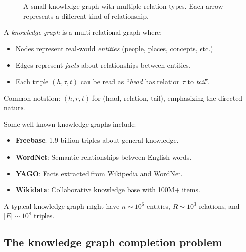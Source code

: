 \begin{notechapter}
\begin{figure}[htbp]
\caption{A small knowledge graph with multiple relation types. Each arrow represents a different kind of relationship.}
\label{shallow-embeddings:fig:knowledge_graph}
\end{figure}

\begin{definition}
A \emph{knowledge graph} is a multi-relational graph where:
\begin{itemize}
    \item Nodes represent real-world \emph{entities} (people, places, concepts, etc.)
    \item Edges represent \emph{facts} about relationships between entities.
    \item Each triple $(h, \tau, t)$ can be read as ``\emph{head} has relation $\tau$ to \emph{tail}''.
\end{itemize}
Common notation: $(h, r, t)$ for (head, relation, tail), emphasizing the directed nature.
\end{definition}

\begin{example}
Some well-known knowledge graphs include:
\begin{itemize}
    \item \textbf{Freebase}: 1.9 billion triples about general knowledge.
    \item \textbf{WordNet}: Semantic relationships between English words.
    \item \textbf{YAGO}: Facts extracted from Wikipedia and WordNet.
    \item \textbf{Wikidata}: Collaborative knowledge base with 100M+ items.
\end{itemize}
A typical knowledge graph might have $n \sim 10^6$ entities, $R \sim 10^3$ relations, and $|E| \sim 10^8$ triples.
\end{example}

\subsection{The knowledge graph completion problem}


\end{notechapter}
